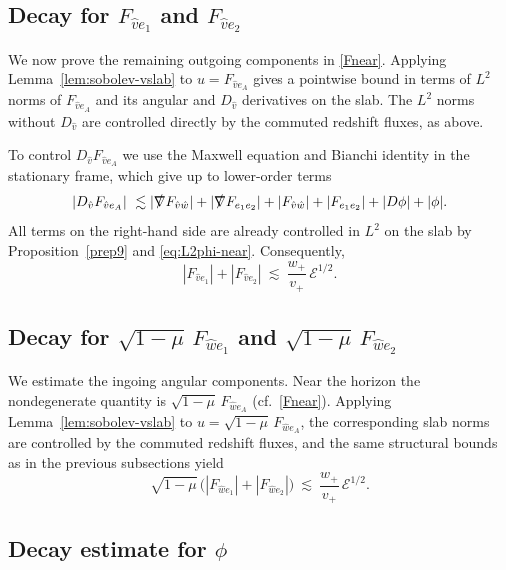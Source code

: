 \documentclass[11pt]{article}
\numberwithin{equation}{section}
\theoremstyle{plain}
\theoremstyle{definition}
\theoremstyle{remark}
\newcommand{\vplus}{v_{+}}
\newcommand{\wplus}{w_{+}}
\begin{document}
\subsection{Decay for \texorpdfstring{$F_{\hat v e_1}$ and $F_{\hat v e_2}$}{}}\label{subsec:decay-FvA}

We now prove the remaining outgoing components in \eqref{Fnear}.
Applying Lemma~\ref{lem:sobolev-vslab} to $u=F_{\hat v e_{A}}$ gives a pointwise bound in terms of
$L^{2}$ norms of $F_{\hat v e_{A}}$ and its angular and $D_{\hat v}$ derivatives on the slab.
The $L^{2}$ norms without $D_{\hat v}$ are controlled directly by the commuted redshift fluxes, as above.

To control $D_{\hat v}F_{\hat v e_{A}}$ we use the Maxwell equation and Bianchi identity in the stationary frame,
which give up to lower-order terms
\begin{equation}\label{eq:dv-FvA-structural}
|D_{\hat v}F_{\hat v e_{A}}|
\ \lesssim
|\slashed{\nabla}F_{\hat v\hat w}|+|\slashed{\nabla}F_{e_{1}e_{2}}|
+|F_{\hat v\hat w}|+|F_{e_{1}e_{2}}|+|D\phi|+|\phi|.
\end{equation}
All terms on the right-hand side are already controlled in $L^{2}$ on the slab by Proposition~\ref{prep9} and \eqref{eq:L2phi-near}.
Consequently,
\begin{equation}
|F_{\hat v e_{1}}|+|F_{\hat v e_{2}}|
\ \lesssim\ \frac{\wplus}{\vplus}\,\mathcal{E}^{1/2}.
\end{equation}

\subsection{Decay for \texorpdfstring{$\sqrt{1-\mu}\,F_{\hat w e_1}$ and $\sqrt{1-\mu}\,F_{\hat w e_2}$}{}}\label{subsec:decay-FwA}

We estimate the ingoing angular components.
Near the horizon the nondegenerate quantity is $\sqrt{1-\mu}\,F_{\hat w e_{A}}$ (cf.~\eqref{Fnear}).
Applying Lemma~\ref{lem:sobolev-vslab} to $u=\sqrt{1-\mu}\,F_{\hat w e_{A}}$,
the corresponding slab norms are controlled by the commuted redshift fluxes, and the same structural bounds as in the previous subsections yield
\begin{equation}
\sqrt{1-\mu}\,\bigl(|F_{\hat w e_{1}}|+|F_{\hat w e_{2}}|\bigr)
\ \lesssim\ \frac{\wplus}{\vplus}\,\mathcal{E}^{1/2}.
\end{equation}

\subsection{Decay estimate for \texorpdfstring{$\phi$}{}}\label{subsec:decay-phi-near}
\end{document}
